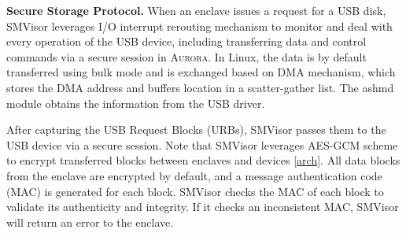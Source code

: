 
\textbf{Secure Storage Protocol.}
When an enclave issues a request for a USB disk, SMVisor leverages I/O interrupt rerouting mechanism to monitor and deal with every operation of the USB device, including transferring data and control commands via a secure session in \textsc{Aurora}. In Linux, the data is by default transferred using bulk mode and is exchanged based on DMA mechanism, which stores the DMA address and buffers location in a {scatter-gather} list. The ashmd module obtains the information from the USB driver.

After capturing the USB Request Blocks (URBs), SMVisor passes them to the USB device via a secure session.  Note that SMVisor leverages AES-GCM scheme to encrypt transferred blocks between enclaves and devices \ref{arch}. All data blocks from the enclave are encrypted by default, and a message authentication code (MAC) is generated for each block. SMVisor checks the MAC of each block to validate its authenticity and integrity. If it checks an inconsistent MAC, SMVisor will return an error to the enclave.


